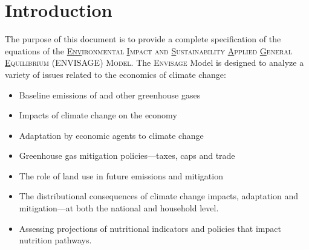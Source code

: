 \documentclass[11pt,letterpaper]{report}
\begin{document}

\pagestyle{plain}
\setcounter{page}{2}

\tableofcontents
\newpage

\listoftables
\newpage

\listoffigures
\newpage

\setcounter{page}{1}
\pagestyle{plain}
\renewcommand*{\thefootnote}{\arabic{footnote}}
\setcounter{footnote}{0}

\chapter{Introduction}
\renewcommand{\thepage}{\arabic{page}}%
\setcounter{page}{1}

The purpose of this document is to provide a complete specification of the
equations of the \textsc{\underline{Env}ironmental} \textsc{\underline{I}mpact}
\textsc{and} \textsc{\underline{S}ustainability} \textsc{\underline{A}pplied}
\textsc{\underline{G}eneral} \textsc{\underline{E}quilibrium}
(\textsc{\textsc{ENVISAGE}}) \textsc{Model}. The \textsc{Envisage} Model is
designed to analyze a variety of issues related to the economics of climate
change:

\begin{itemize}
   \item Baseline emissions of \COT{} and other greenhouse gases
   \item Impacts of climate change on the economy
   \item Adaptation by economic agents to climate change
   \item Greenhouse gas mitigation policies---taxes, caps and trade
   \item The role of land use in future emissions and mitigation
   \item The distributional consequences of climate change impacts, adaptation
         and mitigation---at both the national and household level.
   \item Assessing projections of nutritional indicators and policies
   that impact nutrition pathways.
\end{itemize}
\end{document}
